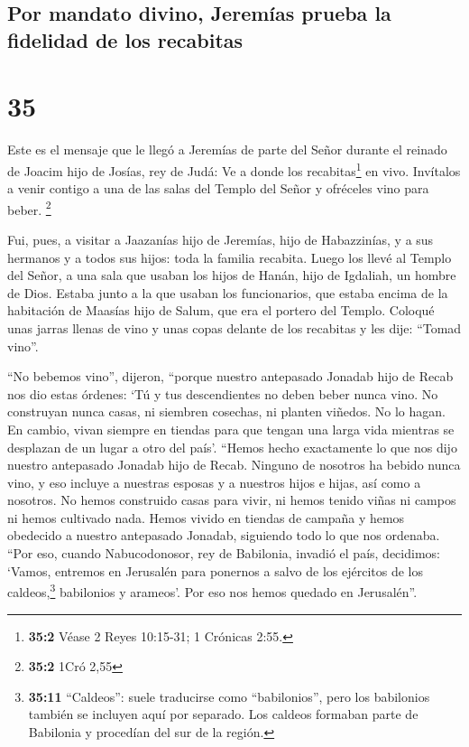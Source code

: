 \hypertarget{por-mandato-divino-jeremuxedas-prueba-la-fidelidad-de-los-recabitas}{%
\subsection{Por mandato divino, Jeremías prueba la fidelidad de los
recabitas}\label{por-mandato-divino-jeremuxedas-prueba-la-fidelidad-de-los-recabitas}}

\hypertarget{section-34}{%
\section{35}\label{section-34}}

 Este es el mensaje que le llegó a Jeremías de parte del
Señor durante el reinado de Joacim hijo de Josías, rey de Judá:
 Ve a donde los recabitas\footnote{\textbf{35:2} Véase 2
  Reyes 10:15-31; 1 Crónicas 2:55.} en vivo. Invítalos a venir contigo a
una de las salas del Templo del Señor y ofréceles vino para beber.
\footnote{\textbf{35:2} 1Cró 2,55}

 Fui, pues, a visitar a Jaazanías hijo de Jeremías, hijo
de Habazzinías, y a sus hermanos y a todos sus hijos: toda la familia
recabita.  Luego los llevé al Templo del Señor, a una sala
que usaban los hijos de Hanán, hijo de Igdaliah, un hombre de Dios.
Estaba junto a la que usaban los funcionarios, que estaba encima de la
habitación de Maasías hijo de Salum, que era el portero del Templo.
 Coloqué unas jarras llenas de vino y unas copas delante
de los recabitas y les dije: ``Tomad vino''.

 ``No bebemos vino'', dijeron, ``porque nuestro antepasado
Jonadab hijo de Recab nos dio estas órdenes: `Tú y tus descendientes no
deben beber nunca vino.  No construyan nunca casas, ni
siembren cosechas, ni planten viñedos. No lo hagan. En cambio, vivan
siempre en tiendas para que tengan una larga vida mientras se desplazan
de un lugar a otro del país'.  ``Hemos hecho exactamente
lo que nos dijo nuestro antepasado Jonadab hijo de Recab. Ninguno de
nosotros ha bebido nunca vino, y eso incluye a nuestras esposas y a
nuestros hijos e hijas, así como a nosotros.  No hemos
construido casas para vivir, ni hemos tenido viñas ni campos ni hemos
cultivado nada.  Hemos vivido en tiendas de campaña y
hemos obedecido a nuestro antepasado Jonadab, siguiendo todo lo que nos
ordenaba.  ``Por eso, cuando Nabucodonosor, rey de
Babilonia, invadió el país, decidimos: `Vamos, entremos en Jerusalén
para ponernos a salvo de los ejércitos de los caldeos,\footnote{\textbf{35:11}
  ``Caldeos'': suele traducirse como ``babilonios'', pero los babilonios
  también se incluyen aquí por separado. Los caldeos formaban parte de
  Babilonia y procedían del sur de la región.} babilonios y arameos'.
Por eso nos hemos quedado en Jerusalén''.

